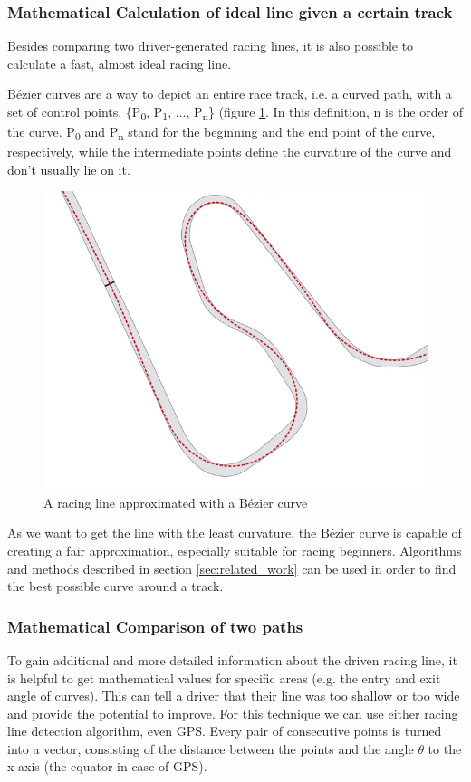 \subsubsection{Mathematical Calculation of ideal line given a certain track}
Besides comparing two driver-generated racing lines, it is also possible to calculate a fast, almost ideal racing line.

Bézier curves are a way to depict an entire race track, i.e. a curved path, with a set of control points, \{P\textsubscript{0}, P\textsubscript{1}, ..., P\textsubscript{n}\} (figure \ref{fig:bezier}. In this definition, n is the order of the curve. P\textsubscript{0} and P\textsubscript{n} stand for the beginning and the end point of the curve, respectively, while the intermediate points define the curvature of the curve and don't usually lie on it.

\begin{figure}[!ht]
\includegraphics[width=\textwidth]{bezier_track}
\caption{A racing line approximated with a Bézier curve}
\label{fig:bezier}
\end{figure}


As we want to get the line with the least curvature, the Bézier curve is capable of creating a fair approximation, especially suitable for racing beginners.
Algorithms and methods described in section \ref{sec:related_work} can be used in order to find the best possible curve around a track.

\subsubsection{Mathematical Comparison of two paths}
To gain additional and more detailed information about the driven racing line, it is helpful to get mathematical values for specific areas (e.g. the entry and exit angle of curves). This can tell a driver that their line was too shallow or too wide and provide the potential to improve.
For this technique we can use either racing line detection algorithm, even GPS. Every pair of consecutive points is turned into a vector, consisting of the distance between the points and the angle $\theta$ to the x-axis (the equator in case of GPS).


